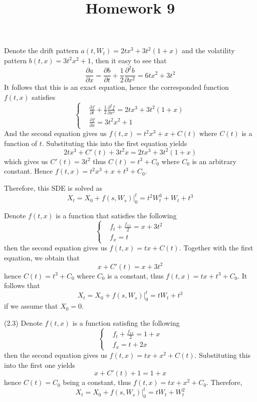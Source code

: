 \documentclass{homework}
\title{Homework 9}
\begin{document}
    \maketitle

    \problem
    Denote the drift pattern $a(t,W_t)=2tx^3+3t^2(1+x)$
    and the volatility pattern $b(t,x)=3t^2x^2+1$, then
    it easy to see that
    \[\frac{\partial a}{\partial x}
    =\frac{\partial b}{\partial t}+
    \frac{1}{2}\frac{\partial^2 b}{\partial x^2}
    =6tx^2+3t^2\]
    It follows that this is an exact equation, hence the
    corresponded function $f(t,x)$ satisfies
    \[\left\{\begin{aligned}
        &\frac{\partial f}{\partial t}+\frac{1}{2}\frac{\partial^2 f}{\partial x^2}
        =2tx^3+3t^2(1+x)\\
        &\frac{\partial f}{\partial x}=3t^2x^2+1
    \end{aligned}\right.\]
    And the second equation gives us $f(t,x)=t^2x^3+x+C(t)$ where $C(t)$ is
    a function of $t$. Substituting this into the first equation yields
    \[2tx^3+C'(t)+3t^2x=2tx^3+3t^2(1+x)\]
    which gives us $C'(t)=3t^2$ thus $C(t)=t^3+C_0$ where $C_0$ is an arbitrary constant.
    Hence $f(t,x)=t^2x^3+x+t^3+C_0$.

    Therefore, this SDE is solved as
    \[X_t=X_0+f(s,W_s)|_0^t=t^2W_t^3+W_t+t^3\]

    \problem
    \begin{subproblem}[(2.\arabic*)]
        \item
        Denote $f(t,x)$ is a function that satisfies the following
        \[\left\{\begin{aligned}
            &f_t+\frac{f_{xx}}{2}=x+3t^2\\
            &f_x=t
        \end{aligned}\right.\]
        then the second equation gives us $f(t,x)=tx+C(t)$.
        Together with the first equation, we obtain that
        \[x+C'(t)=x+3t^2\]
        hence $C(t)=t^3+C_0$ where $C_0$ is a constant,
        thus $f(t,x)=tx+t^3+C_0$. 
        It follows that
        \[X_t=X_0+f(s,W_s)|_0^t=tW_t+t^3\]
        if we assume that $X_0=0$.

        \item[(2.3)]
        Denote $f(t,x)$ is a function satisfing the following
        \[\left\{\begin{aligned}
            &f_t+\frac{f_{xx}}{2}=1+x\\
            &f_x=t+2x
        \end{aligned}\right.\]
        then the second equation gives us $f(t,x)=tx+x^2+C(t)$.
        Substituting this into the first one yields
        \[x+C'(t)+1=1+x\]
        hence $C(t)=C_0$ being a constant, thus $f(t,x)=tx+x^2+C_0$.
        Therefore,
        \[X_t=X_0+f(s,W_s)|_0^t=tW_t+W_t^2\]
    \end{subproblem}
\end{document}
